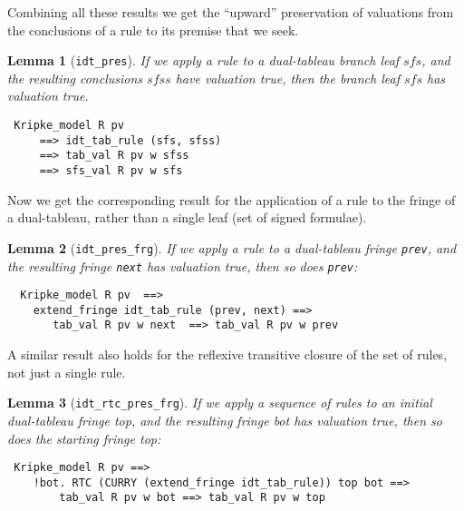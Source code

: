 \documentclass[a4paper]{article}
\newtheorem{lemma}{Lemma}
\begin{document}
Combining all these results we get the ``upward'' preservation of
valuations from the conclusions of a rule to its premise that we seek.
\begin{lemma}[\texttt{idt\_pres}] \label{idt-pres}
  If we apply a rule to a dual-tableau branch leaf $\mathit{sfs}$,
  and the resulting conclusions $\mathit{sfss}$
  have valuation true,
  then the branch leaf $\mathit{sfs}$ has valuation true.
\end{lemma}
\begin{verbatim}
 Kripke_model R pv 
     ==> idt_tab_rule (sfs, sfss) 
     ==> tab_val R pv w sfss 
     ==> sfs_val R pv w sfs
\end{verbatim}

Now we get the corresponding result for the application of a rule to 
the fringe of a dual-tableau, rather than a single leaf (set of signed formulae).
\begin{lemma}[\texttt{idt\_pres\_frg}] \label{idt-pres-frg} If we
  apply a rule to a dual-tableau fringe \texttt{prev}, and the
  resulting fringe \texttt{next} has valuation true, then so does 
\texttt{prev}:
\end{lemma}
\begin{verbatim}
  Kripke_model R pv  ==> 
    extend_fringe idt_tab_rule (prev, next) ==> 
       tab_val R pv w next  ==> tab_val R pv w prev
\end{verbatim}

A similar result also holds for the 
reflexive transitive closure of the set of rules, not just a single rule.
\begin{lemma}[\texttt{idt\_rtc\_pres\_frg}] \label{idt-rtc-pres-frg}
  If we apply a sequence of rules to an initial dual-tableau fringe
  \textit{top}, and the resulting fringe \textit{bot} has
  valuation true, then so does the starting fringe \textit{top}:
\end{lemma}
\begin{verbatim}
 Kripke_model R pv ==>
    !bot. RTC (CURRY (extend_fringe idt_tab_rule)) top bot ==> 
        tab_val R pv w bot ==> tab_val R pv w top
\end{verbatim}
\end{document}
